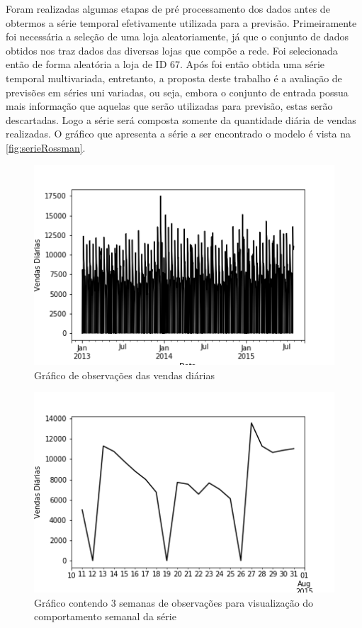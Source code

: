 \documentclass[
    12pt,
    oneside,
    a4paper,
    english,
    brazil
]{abntex2}
\begin{document}
Foram realizadas algumas etapas de pré processamento dos dados antes de
obtermos a série temporal efetivamente utilizada para a previsão.
Primeiramente foi necessária a seleção de uma loja aleatoriamente, já que o
conjunto de dados obtidos nos traz dados das diversas lojas que compõe a rede.
Foi selecionada então de forma aleatória a loja de ID 67. Após foi então obtida
uma série temporal multivariada, entretanto, a proposta deste trabalho é a
avaliação de previsões em séries uni variadas, ou seja, embora o conjunto de
entrada possua mais informação que aquelas que serão utilizadas para previsão,
estas serão descartadas. Logo a série será composta somente da quantidade
diária de vendas realizadas. O gráfico que apresenta a série a ser encontrado o
modelo é vista na \autoref{fig:serieRossman}.

\begin{figure}[ht]
    \centering
    \caption{Gráfico de observações das vendas diárias}\label{fig:serieRossman}
    \includegraphics[width=.6\textwidth]{images/graficoRossman.png}
\end{figure}

\begin{figure}[ht]
    \centering
    \caption{Gráfico contendo 3 semanas de observações para visualização do
        comportamento semanal da série}\label{fig:serieRossmanSemana}
    \includegraphics[width=.6\textwidth]{images/graficoRossmanSemana.png}
\end{figure}
\end{document}
